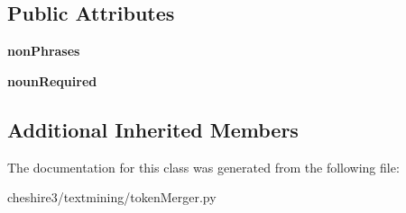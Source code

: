\subsection*{Public Attributes}
\begin{DoxyCompactItemize}
\item 
\hypertarget{classcheshire3_1_1textmining_1_1token_merger_1_1_pos_phrase_token_merger_a5fbb9fbe44e3b80d8a7f891e8ed1b1c2}{{\bfseries non\-Phrases}}\label{classcheshire3_1_1textmining_1_1token_merger_1_1_pos_phrase_token_merger_a5fbb9fbe44e3b80d8a7f891e8ed1b1c2}

\item 
\hypertarget{classcheshire3_1_1textmining_1_1token_merger_1_1_pos_phrase_token_merger_ad324683175574740c40450e39d5a9462}{{\bfseries noun\-Required}}\label{classcheshire3_1_1textmining_1_1token_merger_1_1_pos_phrase_token_merger_ad324683175574740c40450e39d5a9462}

\end{DoxyCompactItemize}
\subsection*{Additional Inherited Members}


The documentation for this class was generated from the following file\-:\begin{DoxyCompactItemize}
\item 
cheshire3/textmining/token\-Merger.\-py\end{DoxyCompactItemize}
